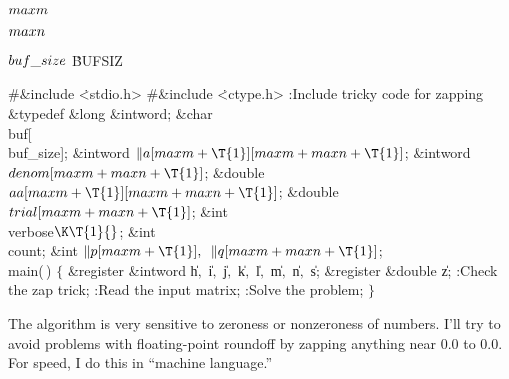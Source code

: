 \Y\B\4\D$\\{maxm}$ \5
\par
\B\4\D$\\{maxn}$ \5
\par
\B\4\D$\\{buf\_size}$ \5
\.{BUFSIZ}\par
\Y\B\8\#\&{include} \.{<stdio.h>}\6
\8\#\&{include} \.{<ctype.h>}\6
:Include tricky code for zapping\X\7
\&{typedef} \&{long} \&{intword};\6
\&{char} \\{buf}[\\{buf\_size}];\6
\&{intword} ${}\|a[\\{maxm}+\T{1}][\\{maxm}+\\{maxn}+\T{1}]{}$;\6
\&{intword} ${}\\{denom}[\\{maxm}+\\{maxn}+\T{1}]{}$;\6
\&{double} ${}\\{aa}[\\{maxm}+\T{1}][\\{maxm}+\\{maxn}+\T{1}]{}$;\6
\&{double} ${}\\{trial}[\\{maxm}+\\{maxn}+\T{1}]{}$;\6
\&{int} \\{verbose}${}\K\T{1}{}$;\6
\&{int} \\{count};\6
\&{int} ${}\|p[\\{maxm}+\T{1}],{}$ ${}\|q[\\{maxm}+\\{maxn}+\T{1}]{}$;\7
\\{main}(\,)\1\1\2\2\6
${}\{{}$\1\6
\&{register} \&{intword} \|h${},{}$ \|i${},{}$ \|j${},{}$ \|k${},{}$ \|l${},{}$
\|m${},{}$ \|n${},{}$ \|s;\6
\&{register} \&{double} \|z;\7
:Check the zap trick\X;\6
:Read the input matrix\X;\6
:Solve the problem\X;\6
\4${}\}{}$\2\par
\fi

The algorithm is very sensitive to zeroness or nonzeroness of
numbers.
I'll try to avoid problems with floating-point roundoff by zapping
anything near 0.0 to 0.0. For speed, I do this in ``machine language.''

